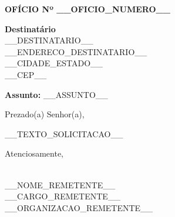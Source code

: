 \documentclass[a4paper,12pt]{article}
\begin{document}
\begin{center}
    \textbf{OFÍCIO Nº __OFICIO_NUMERO__}
\end{center}

\vspace{1cm}

\begin{flushright}
    \textbf{Destinatário} \\
    __DESTINATARIO__ \\
    __ENDERECO_DESTINATARIO__ \\
    __CIDADE_ESTADO__ \\
    __CEP__
\end{flushright}

\vspace{1cm}

\textbf{Assunto:} __ASSUNTO__

\vspace{1cm}

Prezado(a) Senhor(a),

\bigskip

__TEXTO_SOLICITACAO__

\bigskip

Atenciosamente,

\vspace{1cm}

\hrulefill \\
__NOME_REMETENTE__ \\
__CARGO_REMETENTE__ \\
__ORGANIZACAO_REMETENTE__ \\
\end{document}
